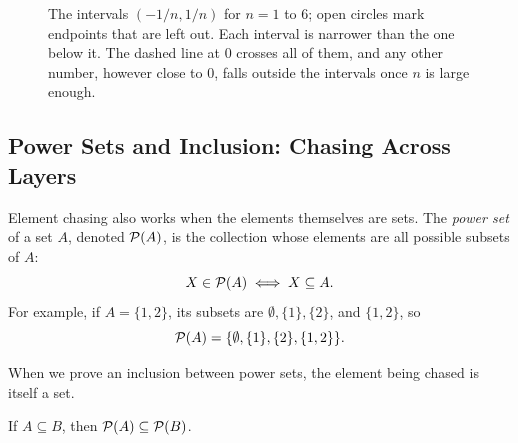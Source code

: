 \begin{figure}[htbp]
\centering
{}
\caption{The intervals $(-1/n, 1/n)$ for $n = 1$ to $6$; open circles mark endpoints that are left out. Each interval is narrower than the one below it. The dashed line at $0$ crosses all of them, and any other number, however close to $0$, falls outside the intervals once $n$ is large enough.}
\label{11:fig-shrinking-intervals}
\end{figure}

\subsection{Power Sets and Inclusion: Chasing Across Layers}

Element chasing also works when the elements themselves are sets. The \emph{power set} of a set $A$, denoted $\mathcal{P}(A)$, is the collection whose elements are all possible subsets of $A$:
\[
X \in \mathcal{P}(A) \iff X \subseteq A.
\]
For example, if $A = \{1, 2\}$, its subsets are $\emptyset, \{1\}, \{2\}$, and $\{1, 2\}$, so
\[
\mathcal{P}(A) = \{\emptyset, \{1\}, \{2\}, \{1, 2\}\}.
\]

When we prove an inclusion between power sets, the element being chased is itself a set.

\begin{theorem}\label{11:thm-powerset-monotone}
If $A \subseteq B$, then $\mathcal{P}(A) \subseteq \mathcal{P}(B)$.
\end{theorem}

